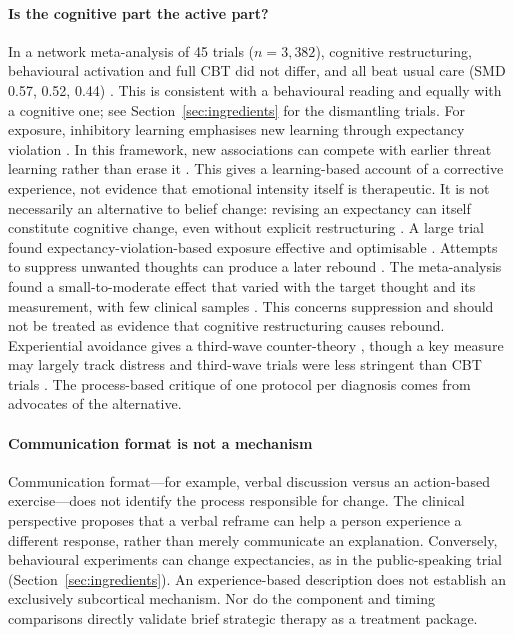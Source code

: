 \paragraph{Is the cognitive part the active part?} In a network meta-analysis of 45 trials ($n=3{,}382$), cognitive restructuring, behavioural activation and full CBT did not differ, and all beat usual care (SMD 0.57, 0.52, 0.44) \citep{ciharova2021restructuring}.
This is consistent with a behavioural reading and equally with a cognitive one; see Section~\ref{sec:ingredients} for the dismantling trials.
For exposure, inhibitory learning emphasises new learning through expectancy violation \citep{vervliet2013extinction,weisman2018augmentation}.
In this framework, new associations can compete with earlier threat learning rather than erase it \citep{craske2014maximizing}.
This gives a learning-based account of a corrective experience, not evidence that emotional intensity itself is therapeutic.
It is not necessarily an alternative to belief change: revising an expectancy can itself constitute cognitive change, even without explicit restructuring \citep{hofmann2008extinction}.
A large trial found expectancy-violation-based exposure effective and optimisable \citep{pittig2021intensified}.
Attempts to suppress unwanted thoughts can produce a later rebound \citep{wenzlaff2000suppression,abramowitz2001suppression}.
The meta-analysis found a small-to-moderate effect that varied with the target thought and its measurement, with few clinical samples \citep{abramowitz2001suppression}.
This concerns suppression and should not be treated as evidence that cognitive restructuring causes rebound.
Experiential avoidance gives a third-wave counter-theory \citep{hayes1996avoidance}, though a key measure may largely track distress \citep{wolgast2014aaq} and third-wave trials were less stringent than CBT trials \citep{ost2008thirdwave}.
The process-based critique of one protocol per diagnosis \citep{hayes2021processbased,hofmann2019process} comes from advocates of the alternative.

\paragraph{Communication format is not a mechanism} Communication format---for example, verbal discussion versus an action-based exercise---does not identify the process responsible for change.
The clinical perspective proposes that a verbal reframe can help a person experience a different response, rather than merely communicate an explanation.
Conversely, behavioural experiments can change expectancies, as in the public-speaking trial (Section~\ref{sec:ingredients}).
An experience-based description does not establish an exclusively subcortical mechanism.
Nor do the component and timing comparisons directly validate brief strategic therapy as a treatment package.

